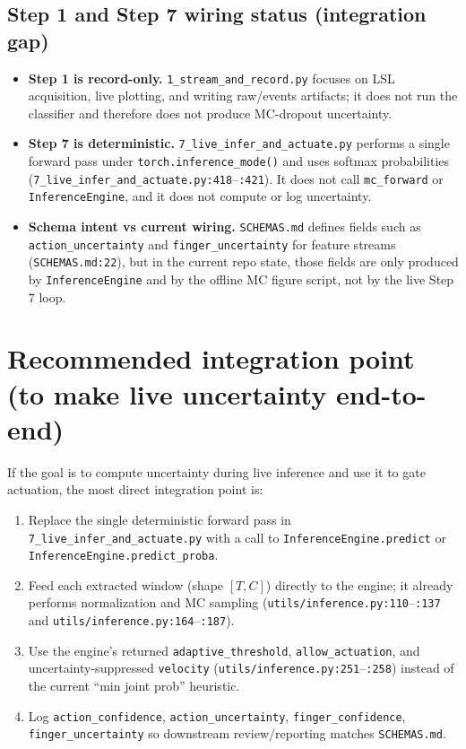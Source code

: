 \documentclass[11pt]{article}
\begin{document}
\subsection{Step 1 and Step 7 wiring status (integration gap)}
\begin{itemize}
  \item \textbf{Step 1 is record-only.}
  \texttt{1\_stream\_and\_record.py} focuses on LSL acquisition, live plotting, and writing raw/events artifacts; it does not run the classifier and therefore does not produce MC-dropout uncertainty.
  \item \textbf{Step 7 is deterministic.}
  \texttt{7\_live\_infer\_and\_actuate.py} performs a single forward pass under \texttt{torch.inference\_mode()} and uses softmax probabilities (\texttt{7\_live\_infer\_and\_actuate.py:418}--\texttt{:421}).
  It does not call \texttt{mc\_forward} or \texttt{InferenceEngine}, and it does not compute or log uncertainty.
  \item \textbf{Schema intent vs current wiring.}
  \texttt{SCHEMAS.md} defines fields such as \texttt{action\_uncertainty} and \texttt{finger\_uncertainty} for feature streams (\texttt{SCHEMAS.md:22}), but in the current repo state, those fields are only produced by \texttt{InferenceEngine} and by the offline MC figure script, not by the live Step 7 loop.
\end{itemize}

\section{Recommended integration point (to make live uncertainty end-to-end)}

If the goal is to compute uncertainty during live inference and use it to gate actuation, the most direct integration point is:

\begin{enumerate}
  \item Replace the single deterministic forward pass in \texttt{7\_live\_infer\_and\_actuate.py} with a call to \texttt{InferenceEngine.predict} or \texttt{InferenceEngine.predict\_proba}.
  \item Feed each extracted window (shape $[T,C]$) directly to the engine; it already performs normalization and MC sampling (\texttt{utils/inference.py:110}--\texttt{:137} and \texttt{utils/inference.py:164}--\texttt{:187}).
  \item Use the engine's returned \texttt{adaptive\_threshold}, \texttt{allow\_actuation}, and uncertainty-suppressed \texttt{velocity} (\texttt{utils/inference.py:251}--\texttt{:258}) instead of the current ``min joint prob'' heuristic.
  \item Log \texttt{action\_confidence}, \texttt{action\_uncertainty}, \texttt{finger\_confidence}, \texttt{finger\_uncertainty} so downstream review/reporting matches \texttt{SCHEMAS.md}.
\end{enumerate}
\end{document}
